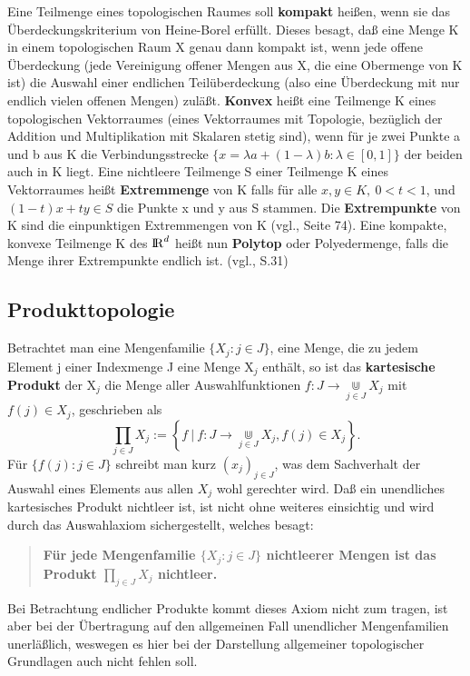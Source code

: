Eine Teilmenge eines topologischen Raumes soll {\bf kompakt} heißen, wenn sie
das Überdeckungskriterium von Heine-Borel erfüllt. Dieses besagt, daß
eine Menge K in einem topologischen Raum X genau dann kompakt
ist, wenn jede offene Überdeckung (jede Vereinigung offener Mengen aus X, die
eine Obermenge von K ist) die Auswahl einer endlichen Teilüberdeckung
(also eine Überdeckung mit nur endlich vielen offenen Mengen) zuläßt.
{\bf Konvex} heißt eine Teilmenge K eines topologischen Vektorraumes (eines
Vektorraumes mit Topologie, bezüglich der Addition und Multiplikation mit
Skalaren stetig sind), wenn für je zwei Punkte a und b aus K
die Verbindungsstrecke $\{x=\lambda a +(1-\lambda) b:\lambda\in [0,1]\}$
der beiden auch in K liegt. Eine nichtleere Teilmenge S einer Teilmenge K
eines Vektorraumes heißt {\bf Extremmenge} von K
falls für alle $x,y\in K,~0<t<1$, und $(1-t)x+ty\in S$ die Punkte x und y aus
S stammen. Die {\bf Extrempunkte} von K sind die einpunktigen
Extremmengen von K (vgl.\cite{Ru:91}, Seite 74).
Eine kompakte, konvexe Teilmenge K des $\mbox{$\rm I\!R$}^d$ heißt nun {\bf Polytop} oder
Polyedermenge, falls die Menge ihrer Extrempunkte endlich ist.
(vgl.\cite{Gr:67}, S.31)

\subsection{Produkttopologie}

Betrachtet man eine Mengenfamilie $\{X_j:j\in J\}$, eine Menge, die zu jedem
Element j einer Indexmenge J eine Menge X$_j$ enthält, so ist das {\bf
kartesische Produkt} der X$_j$ die Menge aller
Auswahlfunktionen $f:J\to\Cup\limits_{j\in J} X_j$ mit $f(j)\in X_j$,
geschrieben als
$$
\prod\limits_{j\in J}X_j:=
\left\{f~|~f:J\to\Cup\limits_{j\in J} X_j,f(j)\in X_j\right\}.
$$
Für $\{f(j):j\in J\}$ schreibt man kurz $(x_j)_{j\in J}$, was dem Sachverhalt
der Auswahl eines Elements aus allen $X_j$ wohl gerechter wird.
Daß ein unendliches kartesisches Produkt nichtleer ist, ist nicht ohne weiteres
einsichtig und wird durch das Auswahlaxiom sichergestellt, welches besagt:
\begin{quote}
{\bf
Für jede Mengenfamilie $\{X_j:j\in J\}$ nichtleerer Mengen ist das Produkt
$\prod\limits_{j\in J}X_j$ nichtleer.
}
\end{quote}
Bei Betrachtung endlicher Produkte kommt dieses Axiom nicht zum tragen, ist
aber bei der Übertragung auf den allgemeinen Fall unendlicher Mengenfamilien
unerläßlich, weswegen es hier bei der Darstellung allgemeiner topologischer
Grundlagen auch nicht fehlen soll.

